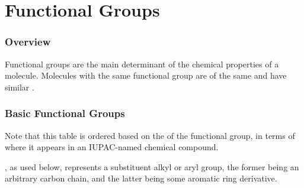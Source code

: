

\pagebreak
\hypertarget{ChapterFunctionalGroups}{}
\part{Functional Groups}

	\section{Overview}

		Functional groups are the main determinant of the chemical properties of a molecule. Molecules with the
		same functional group are of the same  and have similar .


	\section{Basic Functional Groups}

		Note that this table is ordered based on the  of the functional group, in terms of where it appears in
		an IUPAC-named chemical compound.

		, as used below, represents a substituent alkyl or aryl group, the former being an arbitrary carbon chain, and the
		latter being some aromatic ring derivative.

